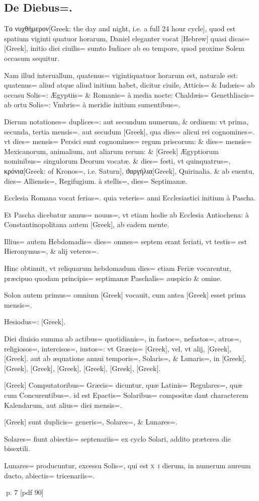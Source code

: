 \subsection{De Diebus=.}
\setcounter{parcount}{0}
\begin{parnumbers}

Το νυχθήμερον[Greek: the day and night, i.e. a full 24 hour cycle], quod est spatium viginti quatuor horarum, Daniel eleganter vocat [Hebrew] quasi dicas= [Greek], initio diei ciuilis= sumto Iudiace ab eo tempore, quod proxime Solem occasum sequitur.

Nam illud interuallum, quatenus= vigintiquatuor horarum est, naturale est: quatenus= aliud atque aliud initium habet, dicitur ciuile, Atticis= \& Iudæis= ab occasu Solis=: Ægyptiis= \& Romanis= à media nocte: Chaldæis= Genethliacis= ab ortu Solis=: Vmbris= à meridie initium  sumentibus=.

Dierum notationes= duplices=: aut secundum numerum, \& ordinem: vt prima, secunda, tertia mensis=. aut secudum [Greek], qua dies= alicui rei cognomines=. vt dies= mensis= Persici sunt cognomines= regum priscorum: \& dies= mensis= Mexicanorum, animalium, aut aliarum rerum: \& [Greek] Ægyptiorum nominibus= singulorum Deorum vocatæ. \& dies= festi, vt quinquatrus=, κρόνια[Greek: of Kronos=, i.e. Saturn], ϑαργήλια[Greek], Quirinalia. \& ab euentu, dies= Alliensis=, Regifugium. à stellis=, dies= Septimanæ.

Ecclesia Romana vocat ferias=. quia veteris= anni Ecclesiastici initium à Pascha.

Et Pascha dicebatur annus= nouus=, vt etiam hodie ab Ecclesia Antiochena: à Constantinopolitana autem [Greek], ab eadem mente.

Illius= autem Hebdomadis= dies= omnes= septem erant  feriati, vt testis= est Hieronymus=, \& alij veteres=.

Hinc obtinuit, vt reliquarum hebdomadum dies= etiam Feriæ vocarentur, præcipuo quodam principis= septimanæ Paschalis= auspicio \& omine.

Solon autem primus= omnium [Greek] vocauit, cum antea [Greek] esset prima mensis=.

Hesiodus=: [Greek].

Diei diuisio summa ab actibus= quotidianis=, in fastos=, nefastos=, atros=, religiosos=, intercisos=, iustos=: vt Græcis= [Greek], vel, vt alij, [Greek], [Greek]. aut ab æquatione annui temporis=, Solaris=, \& Lunaris=, in [Greek], [Greek], [Greek], [Greek], [Greek], [Greek], [Greek].

[Greek] Computatoribus= Græcis= dicuntur, quæ Latinis= Regulares=, quæ cum  Concurentibus=. id est Epactis= Solaribus= compositæ dant characterem Kalendarum, aut alius= diei mensis=.

[Greek] sunt duplicis= generis=, Solares=, \& Lunares=.

Solares= fiunt abiectis= septenariis= ex cyclo Solari, addito præterea die bisextili.

Lunares= producuntur, excessu Solis=, qui est \textsc{x~i} dierum, in numerum aureum ducto, abiectis= tricenariis=.

\end{parnumbers}
\clearpage
p. 7 [pdf 90]

